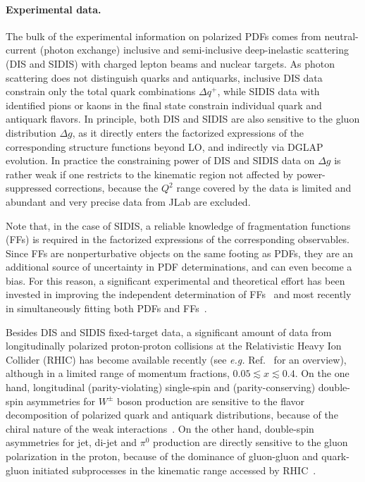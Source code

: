 \paragraph*{Experimental data.}
The bulk of the experimental information on polarized PDFs comes from 
neutral-current (photon exchange) inclusive and semi-inclusive deep-inelastic
scattering (DIS and SIDIS) with charged lepton beams and nuclear targets. 
%
As photon scattering does not distinguish quarks and antiquarks, inclusive DIS 
data constrain only the total quark combinations $\Delta q^+$, 
while SIDIS data with identified pions or kaons in the final state 
constrain individual quark and antiquark flavors. 
%
In principle, both DIS and SIDIS are also sensitive to the gluon 
distribution $\Delta g$, as it directly enters the factorized expressions of
the corresponding structure functions beyond LO, and indirectly via DGLAP 
evolution.
%
In practice the constraining power of DIS and SIDIS data on $\Delta g$ is 
rather weak if one restricts to the kinematic region not affected by
power-suppressed corrections, because the $Q^2$ range covered by 
the data is limited and abundant and very precise data from JLab are 
excluded. 

Note that, in the case of SIDIS, a reliable knowledge of fragmentation 
functions (FFs) is required in the factorized expressions of the 
corresponding observables. 
%
Since FFs are nonperturbative objects on the same footing as PDFs, they are 
an additional source of uncertainty in PDF determinations, and can  
even become a bias.
%
For this reason, a significant experimental and theoretical effort has been
invested in improving the independent determination of 
FFs~\cite{deFlorian:2014xna,deFlorian:2017lwf,
Hirai:2016loo,Sato:2016wqj,Bertone:2017tyb} and most recently in simultaneously 
fitting both PDFs and FFs~\cite{Ethier:2017zbq}.

Besides DIS and SIDIS fixed-target data, a significant amount of data from
longitudinally polarized proton-proton collisions at the Relativistic 
Heavy Ion Collider (RHIC) has become available recently (see {\it e.g.} 
Ref.~\cite{Aschenauer:2015eha} for an overview), although in a limited range 
of momentum fractions, $0.05\lesssim x \lesssim 0.4$.
%
On the one hand, longitudinal (parity-violating) single-spin and 
(parity-conserving) double-spin asymmetries for $W^\pm$ boson production are 
sensitive to the flavor decomposition of polarized quark and antiquark 
distributions, because of the chiral nature of the weak 
interactions~\cite{Bourrely:1993dd}. 
%
On the other hand, double-spin asymmetries for jet, di-jet and $\pi^0$ 
production are directly sensitive to the gluon polarization in 
the proton, because of the dominance of gluon-gluon and quark-gluon initiated 
subprocesses in the kinematic range accessed by RHIC~\cite{Bourrely:1990pz}.

